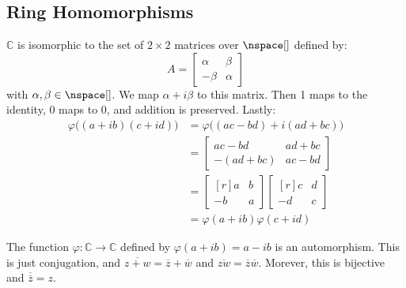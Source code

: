 \documentclass{book}                                                           %
\begin{document}
        \subsection{Ring Homomorphisms}
            \begin{example}
                $\mathbb{C}$ is isomorphic to the set of $2\times{2}$
                matrices over $\nspace[]$ defined by:
                \begin{equation}
                    A=
                    \begin{bmatrix}
                        \alpha&\beta\\
                        \minus\beta&\alpha
                    \end{bmatrix}
                \end{equation}
                with $\alpha,\beta\in\nspace[]$. We map
                $\alpha+i\beta$ to this matrix. Then 1 maps to the identity,
                0 maps to 0, and addition is preserved. Lastly:
                \begin{subequations}
                    \begin{align}
                        \varphi\big((a+ib)(c+id)\big)
                        &=\varphi\big((ac-bd)+i(ad+bc)\big)\\
                        &=
                        \begin{bmatrix}
                            ac-bd&ad+bc\\
                            \minus(ad+bc)&ac-bd
                        \end{bmatrix}\\
                        &=
                        \begin{bmatrix*}[r]
                            a&b\\
                            \minus{b}&a
                        \end{bmatrix*}
                        \begin{bmatrix*}[r]
                            c&d\\
                            \minus{d}&c
                        \end{bmatrix*}\\
                        &=\varphi(a+ib)\varphi(c+id)
                    \end{align}
                \end{subequations}
            \end{example}
            \begin{example}
                The function $\varphi:\mathbb{C}\rightarrow\mathbb{C}$
                defined by $\varphi(a+ib)=a-ib$ is an automorphism. This is
                just conjugation, and
                $\overline{z+w}=\overline{z}+\overline{w}$ and
                $\overline{zw}=\overline{z}\overline{w}$. Morever, this is
                bijective and $\overline{\overline{z}}=z$.
            \end{example}
\end{document}
